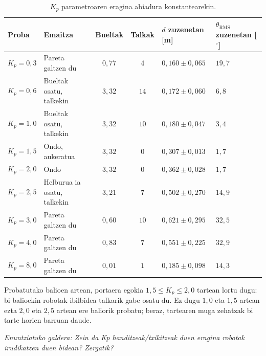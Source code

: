 \begin{table}[H]
\centering\footnotesize
\renewcommand{\arraystretch}{0.88}
\begin{tabularx}{\textwidth}{@{} l >{\raggedright\arraybackslash}X c c >{\centering\arraybackslash}p{2.6cm} >{\centering\arraybackslash}p{2.3cm} @{}}
\toprule
\textbf{Proba} & \textbf{Emaitza} & \textbf{Bueltak} & \textbf{Talkak} & \textbf{$d$ zuzenetan [m]} & \textbf{$\theta_{\text{RMS}}$ zuzenetan [$^\circ$]} \\
\midrule
$K_p = 0{,}3$ & Pareta galtzen du           & $0{,}77$ & $4$  & $0{,}160 \pm 0{,}065$ & $19{,}7$ \\
$K_p = 0{,}6$ & Bueltak osatu, talkekin     & $3{,}32$ & $14$ & $0{,}172 \pm 0{,}060$ & $6{,}8$ \\
$K_p = 1{,}0$ & Bueltak osatu, talkekin     & $3{,}32$ & $10$ & $0{,}180 \pm 0{,}047$ & $3{,}4$ \\
$K_p = 1{,}5$ & Ondo, aukeratua             & $3{,}32$ & $0$  & $0{,}307 \pm 0{,}013$ & $1{,}7$ \\
$K_p = 2{,}0$ & Ondo                        & $3{,}32$ & $0$  & $0{,}362 \pm 0{,}028$ & $1{,}7$ \\
$K_p = 2{,}5$ & Helburua ia osatu, talkekin & $3{,}21$ & $7$  & $0{,}502 \pm 0{,}270$ & $14{,}9$ \\
$K_p = 3{,}0$ & Pareta galtzen du           & $0{,}60$ & $10$ & $0{,}621 \pm 0{,}295$ & $32{,}5$ \\
$K_p = 4{,}0$ & Pareta galtzen du           & $0{,}83$ & $7$  & $0{,}551 \pm 0{,}225$ & $32{,}9$ \\
$K_p = 8{,}0$ & Pareta galtzen du           & $0{,}01$ & $1$  & $0{,}185 \pm 0{,}098$ & $14{,}3$ \\
\bottomrule
\end{tabularx}
\caption{$K_p$ parametroaren eragina abiadura konstantearekin.}\label{tab:kp-sweep}
\end{table}

Probatutako balioen artean, portaera egokia $1{,}5 \le K_p \le 2{,}0$ tartean lortu dugu: bi balioekin robotak ibilbidea talkarik gabe osatu du. Ez dugu $1{,}0$ eta $1{,}5$ artean ezta $2{,}0$ eta $2{,}5$ artean ere baliorik probatu; beraz, tartearen muga zehatzak bi tarte horien barruan daude.

\vspace{0.3em}
\noindent\textit{Enuntziatuko galdera: Zein da Kp handitzeak/txikitzeak duen eragina robotak irudikatzen duen bidean? Zergatik?}\par\vspace{2pt}


